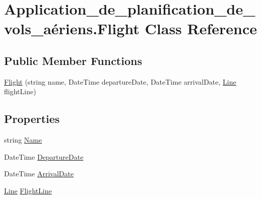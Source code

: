 \hypertarget{class_application__de__planification__de__vols__a_xC3_xA9riens_1_1_flight}{}\section{Application\+\_\+de\+\_\+planification\+\_\+de\+\_\+vols\+\_\+aériens.\+Flight Class Reference}
\label{class_application__de__planification__de__vols__a_xC3_xA9riens_1_1_flight}
\subsection*{Public Member Functions}
\begin{DoxyCompactItemize}
\item 
\hyperlink{class_application__de__planification__de__vols__a_xC3_xA9riens_1_1_flight_a015aaa508e5b822e935c76b5f57d4786}{Flight} (string name, Date\+Time departure\+Date, Date\+Time arrival\+Date, \hyperlink{class_application__de__planification__de__vols__a_xC3_xA9riens_1_1_line}{Line} flight\+Line)
\end{DoxyCompactItemize}
\subsection*{Properties}
\begin{DoxyCompactItemize}
\item 
string \hyperlink{class_application__de__planification__de__vols__a_xC3_xA9riens_1_1_flight_aedf419ab12c95f1f7bb32cf9a81a2895}{Name}
\item 
Date\+Time \hyperlink{class_application__de__planification__de__vols__a_xC3_xA9riens_1_1_flight_ac0c908521ca24657b072aa12515aebaf}{Departure\+Date}
\item 
Date\+Time \hyperlink{class_application__de__planification__de__vols__a_xC3_xA9riens_1_1_flight_a17ee295782eda78e93f0d55beb5ea349}{Arrival\+Date}
\item 
\hyperlink{class_application__de__planification__de__vols__a_xC3_xA9riens_1_1_line}{Line} \hyperlink{class_application__de__planification__de__vols__a_xC3_xA9riens_1_1_flight_abb84b8661cf34d546fbfd1d14e8b0a65}{Flight\+Line}
\end{DoxyCompactItemize}


